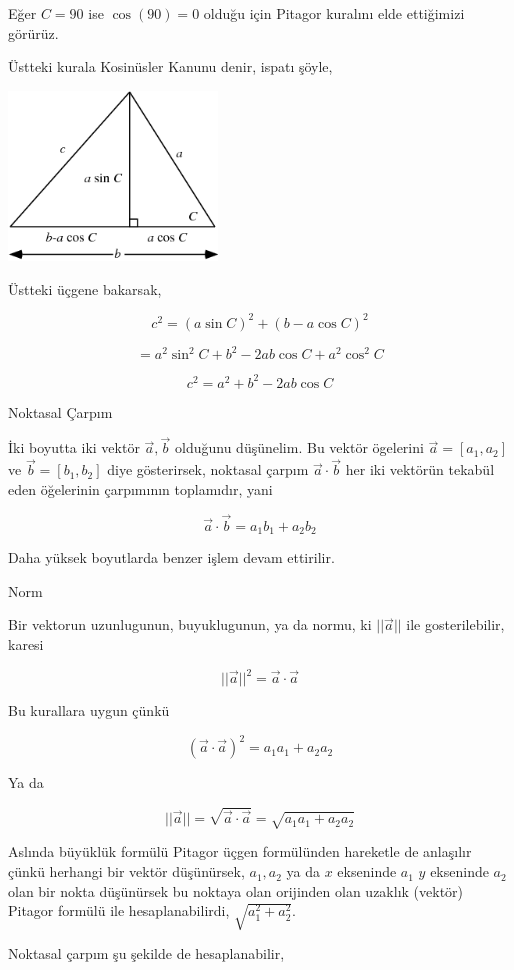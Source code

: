 \documentclass[12pt,fleqn]{article}\usepackage{../../common}
\begin{document}
Eğer $C=90$ ise $\cos(90) = 0$ olduğu için Pitagor kuralını elde ettiğimizi
görürüz. 

Üstteki kurala Kosinüsler Kanunu denir, ispatı şöyle,

\includegraphics[width=15em]{cos2.png}

Üstteki üçgene bakarsak,

$$
c^2 = (a \sin C)^2 + (b-a\cos C)^2
$$

$$
= a^2 \sin^2 C + b^2 - 2 a b \cos C + a^2 \cos^2 C
$$

$$
c^2 = a^2 + b^2 - 2 a b \cos C
$$

Noktasal Çarpım

İki boyutta iki vektör $\vec{a},\vec{b}$ olduğunu düşünelim. Bu vektör ögelerini
$\vec{a} = [a_1, a_2]$ ve $\vec{b} = [b_1, b_2]$ diye gösterirsek, noktasal
çarpım $\vec{a} \cdot \vec{b}$ her iki vektörün tekabül eden öğelerinin
çarpımının toplamıdır, yani

$$
\vec{a} \cdot \vec{b} = a_1 b_1 + a_2 b_2
$$

Daha yüksek boyutlarda benzer işlem devam ettirilir. 

Norm

Bir vektorun uzunlugunun, buyuklugunun, ya da normu, ki $||\vec{a}||$ ile
gosterilebilir, karesi

$$
||\vec{a}||^2 = \vec{a} \cdot \vec{a} 
$$

Bu kurallara uygun çünkü

$$
(\vec{a} \cdot \vec{a})^2 = a_1 a_1 + a_2 a_2
$$

Ya da

$$
||\vec{a}|| = \sqrt{\vec{a} \cdot \vec{a}} = \sqrt{a_1 a_1 + a_2 a_2}
$$

Aslında büyüklük formülü Pitagor üçgen formülünden hareketle de anlaşılır çünkü
herhangi bir vektör düşünürsek, $a_1,a_2$ ya da $x$ ekseninde $a_1$ $y$
ekseninde $a_2$ olan bir nokta düşünürsek bu noktaya olan orijinden olan uzaklık
(vektör) Pitagor formülü ile hesaplanabilirdi, $\sqrt{a_1^2 + a_2^2}$.

Noktasal çarpım şu şekilde de hesaplanabilir,
\end{document}
